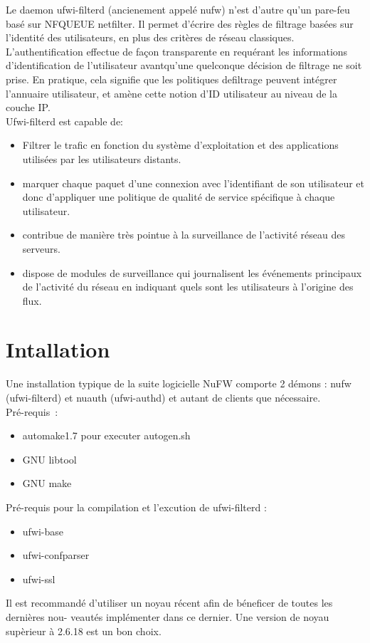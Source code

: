 \documentclass[12pt]{report}
\begin{document}
\begin{itemize}
	Le daemon ufwi-filterd (ancienement appelé nufw) n'est d'autre qu'un pare-feu basé sur NFQUEUE netfilter. Il permet d'écrire des règles de filtrage basées sur l'identité des utilisateurs, en plus des critères de réseau classiques. L'authentification effectue de façon transparente en requérant les informations d’identification de l’utilisateur avantqu’une quelconque décision de filtrage ne soit prise. En pratique, cela signifie que les politiques defiltrage peuvent intégrer l’annuaire utilisateur, et amène cette notion d’ID utilisateur au niveau de la couche IP.\\
Ufwi-filterd est capable de:
\begin{itemize}
  \item Filtrer le trafic en fonction du système d’exploitation et des applications utilisées par les utilisateurs
     distants.
  \item marquer chaque paquet d'une connexion avec l'identifiant de son utilisateur et donc d'appliquer une politique de qualité de service spécifique à chaque utilisateur. 
  \item contribue de manière très pointue à la surveillance de l'activité réseau des serveurs.
  \item dispose de modules de surveillance qui journalisent les événements principaux de l'activité du réseau en indiquant quels sont les utilisateurs à l'origine des flux.
\end{itemize}
\section{Intallation}
Une installation typique de la suite logicielle NuFW comporte 2 démons : nufw (ufwi-filterd) et nuauth (ufwi-authd) et autant de clients que nécessaire.\\
Pré-requis :
\begin{itemize}
  \item automake1.7 pour executer autogen.sh
  \item GNU libtool
  \item GNU make
\end{itemize}
Pré-requis pour la compilation et l'excution de ufwi-filterd :
\begin{itemize}
  \item ufwi-base
  \item ufwi-confparser
  \item ufwi-ssl
\end{itemize}
Il est recommandé d'utiliser un noyau récent afin de béneficer de toutes les dernières nou-
veautés implémenter dans ce dernier. Une version de noyau supèrieur à 2.6.18 est un bon choix.
\newpage

\end{itemize}
\end{document}
